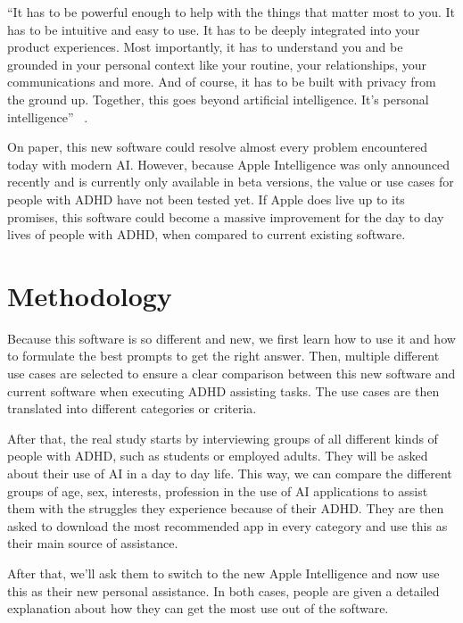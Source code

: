 \documentclass[english]{hogent-article}
\begin{document}
“It has to be powerful enough to help with the things that matter most to you. It has to be intuitive and easy to use. It has to be deeply integrated into your product experiences. Most importantly, it has to understand you and be grounded in your personal context like your routine, your relationships, your communications and more. And of course, it has to be built with privacy from the ground up. Together, this goes beyond artificial intelligence. It's personal intelligence” ~\autocite{Cook2024}.

On paper, this new software could resolve almost every problem encountered today with modern AI. However, because Apple Intelligence was only announced recently and is currently only available in beta versions, the value or use cases for people with ADHD have not been tested yet. If Apple does live up to its promises, this software could become a massive improvement for the day to day lives of people with ADHD, when compared to current existing software. 


\section{Methodology}%
\label{sec:methodology}

Because this software is so different and new, we first learn how to use it and how to formulate the best prompts to get the right answer. Then, multiple different use cases are selected to ensure a clear comparison between this new software and current software when executing ADHD assisting tasks. The use cases are then translated into different categories or criteria. 

After that, the real study starts by interviewing groups of all different kinds of people with ADHD, such as students or employed adults. They will be asked about their use of AI in a day to day life. This way, we can compare the different groups of age, sex, interests, profession in the use of AI applications to assist them with the struggles they experience because of their ADHD. They are then asked to download the most recommended app in every category and use this as their main source of assistance. 

After that, we'll ask them to switch to the new Apple Intelligence and now use this as their new personal assistance. In both cases, people are given a detailed explanation about how they can get the most use out of the software. 
\end{document}

